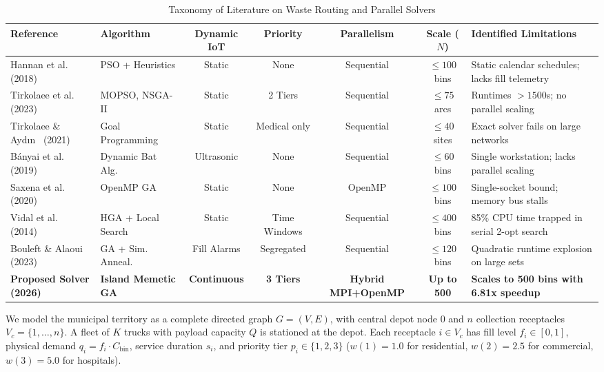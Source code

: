 \documentclass[runningheads]{llncs}
\begin{document}
\begin{table}[t]
\centering
\caption{Taxonomy of Literature on Waste Routing and Parallel Solvers}
\label{tab:literature}
\setlength{\tabcolsep}{3pt}
\begin{adjustbox}{width=\textwidth,center}
\begin{tabular}{lp{2.8cm}ccccl}
\toprule
\textbf{Reference} & \textbf{Algorithm} & \textbf{Dynamic IoT} & \textbf{Priority} & \textbf{Parallelism} & \textbf{Scale ($N$)} & \textbf{Identified Limitations} \\
\midrule
Hannan et al.~\cite{hannan2018capacitated} (2018) & PSO + Heuristics & Static & None & Sequential & $\le 100$ bins & Static calendar schedules; lacks fill telemetry \\
Tirkolaee et al.~\cite{tirkolaee2023novel} (2023) & MOPSO, NSGA-II & Static & 2 Tiers & Sequential & $\le 75$ arcs & Runtimes $>1500$s; no parallel scaling \\
Tirkolaee \& Ayd{\i}n~\cite{tirkolaee2021sustainable} (2021) & Goal Programming & Static & Medical only & Sequential & $\le 40$ sites & Exact solver fails on large networks \\
B{\'a}nyai et al.~\cite{banyai2019optimization} (2019) & Dynamic Bat Alg. & Ultrasonic & None & Sequential & $\le 60$ bins & Single workstation; lacks parallel scaling \\
Saxena et al.~\cite{saxena2020optimized} (2020) & OpenMP GA & Static & None & OpenMP & $\le 100$ bins & Single-socket bound; memory bus stalls \\
Vidal et al.~\cite{vidal2014hybrid} (2014) & HGA + Local Search & Static & Time Windows & Sequential & $\le 400$ bins & 85\% CPU time trapped in serial 2-opt search \\
Bouleft \& Alaoui~\cite{bouleft2023dynamic} (2023) & GA + Sim. Anneal. & Fill Alarms & Segregated & Sequential & $\le 120$ bins & Quadratic runtime explosion on large sets \\
\midrule
\textbf{Proposed Solver (2026)} & \textbf{Island Memetic GA} & \textbf{Continuous} & \textbf{3 Tiers} & \textbf{Hybrid MPI+OpenMP} & \textbf{Up to 500} & \textbf{Scales to 500 bins with 6.81x speedup} \\
\bottomrule
\end{tabular}
\end{adjustbox}
\end{table}

We model the municipal territory as a complete directed graph $G = (V, E)$, with central depot node $0$ and $n$ collection receptacles $V_c = \{1, \dots, n\}$. A fleet of $K$ trucks with payload capacity $Q$ is stationed at the depot. Each receptacle $i \in V_c$ has fill level $f_i \in [0, 1]$, physical demand $q_i = f_i \cdot C_{\text{bin}}$, service duration $s_i$, and priority tier $p_i \in \{1, 2, 3\}$ ($w(1)=1.0$ for residential, $w(2)=2.5$ for commercial, $w(3)=5.0$ for hospitals).
\end{document}
